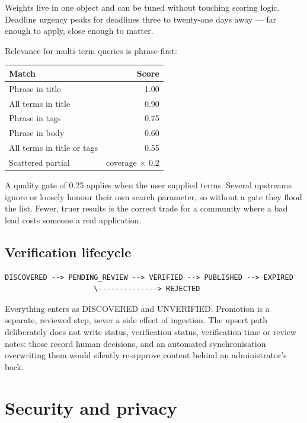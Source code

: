 \documentclass[11pt,a4paper]{report}
\newcommand{\dash}{---}
\begin{document}
Weights live in one object and can be tuned without touching scoring logic.
Deadline urgency peaks for deadlines three to twenty-one days away \dash{} far
enough to apply, close enough to matter.

Relevance for multi-term queries is phrase-first:

\begin{center}
\begin{tabular}{@{}lr@{}}
\toprule
\textbf{Match} & \textbf{Score} \\
\midrule
Phrase in title & 1.00 \\
All terms in title & 0.90 \\
Phrase in tags & 0.75 \\
Phrase in body & 0.60 \\
All terms in title or tags & 0.55 \\
Scattered partial & coverage $\times$ 0.2 \\
\bottomrule
\end{tabular}
\end{center}

A quality gate of 0.25 applies when the user supplied terms. Several upstreams
ignore or loosely honour their own search parameter, so without a gate they
flood the list. Fewer, truer results is the correct trade for a community where
a bad lead costs someone a real application.

\section{Verification lifecycle}

\begin{lstlisting}
DISCOVERED --> PENDING_REVIEW --> VERIFIED --> PUBLISHED --> EXPIRED
                     \--------------> REJECTED
\end{lstlisting}

Everything enters as DISCOVERED and UNVERIFIED. Promotion is a separate,
reviewed step, never a side effect of ingestion. The upsert path deliberately
does not write status, verification status, verification time or review notes:
those record human decisions, and an automated synchronisation overwriting them
would silently re-approve content behind an administrator's back.

\chapter{Security and privacy}
\end{document}
